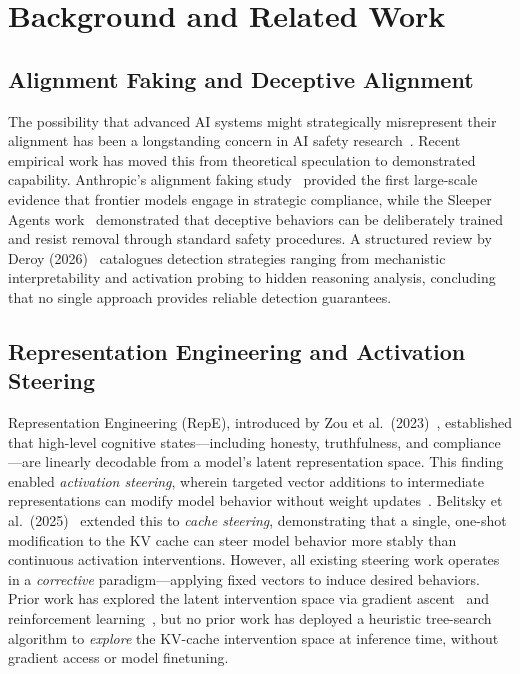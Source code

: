 \documentclass{article}
\begin{document}
\section{Background and Related Work}

\subsection{Alignment Faking and Deceptive Alignment}

The possibility that advanced AI systems might strategically misrepresent their alignment has been a longstanding concern in AI safety research~\cite{deroy2026structured}. Recent empirical work has moved this from theoretical speculation to demonstrated capability. Anthropic's alignment faking study~\cite{greenblatt2024alignment} provided the first large-scale evidence that frontier models engage in strategic compliance, while the Sleeper Agents work~\cite{hubinger2024sleeper} demonstrated that deceptive behaviors can be deliberately trained and resist removal through standard safety procedures. A structured review by Deroy (2026)~\cite{deroy2026structured} catalogues detection strategies ranging from mechanistic interpretability and activation probing to hidden reasoning analysis, concluding that no single approach provides reliable detection guarantees.

\subsection{Representation Engineering and Activation Steering}

Representation Engineering (RepE), introduced by Zou et al.\ (2023)~\cite{zou2023repe}, established that high-level cognitive states---including honesty, truthfulness, and compliance---are linearly decodable from a model's latent representation space. This finding enabled \emph{activation steering}, wherein targeted vector additions to intermediate representations can modify model behavior without weight updates~\cite{turner2023steering}. Belitsky et al.\ (2025)~\cite{belitsky2025kvcache} extended this to \emph{cache steering}, demonstrating that a single, one-shot modification to the KV cache can steer model behavior more stably than continuous activation interventions. However, all existing steering work operates in a \emph{corrective} paradigm---applying fixed vectors to induce desired behaviors. Prior work has explored the latent intervention space via gradient ascent~\cite{bailey2024obfuscated} and reinforcement learning~\cite{gupta2025rlobfuscation}, but no prior work has deployed a heuristic tree-search algorithm to \emph{explore} the KV-cache intervention space at inference time, without gradient access or model finetuning.
\end{document}
